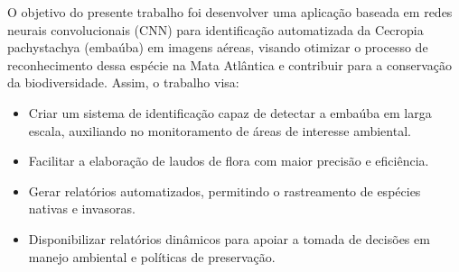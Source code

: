 O objetivo do presente trabalho foi desenvolver uma aplicação baseada em redes neurais convolucionais (CNN) para identificação automatizada da Cecropia pachystachya (embaúba) em imagens aéreas, visando otimizar o processo de reconhecimento dessa espécie na Mata Atlântica e contribuir para a conservação da biodiversidade. Assim, o trabalho visa:
\
\begin{itemize}
\item Criar um sistema de identificação capaz de detectar a embaúba em larga escala, auxiliando no monitoramento de áreas de interesse ambiental.
\item Facilitar a elaboração de laudos de flora com maior precisão e eficiência.
\item Gerar relatórios automatizados, permitindo o rastreamento de espécies nativas e invasoras.
\item Disponibilizar relatórios dinâmicos para apoiar a tomada de decisões em manejo ambiental e políticas de preservação.
\end{itemize}





